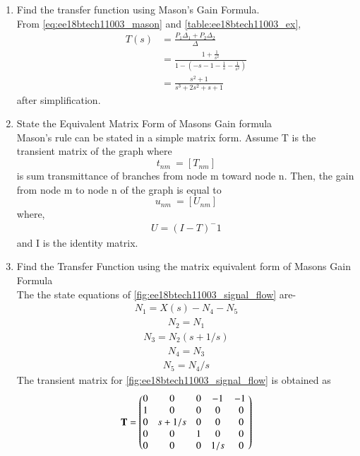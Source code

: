 \begin{enumerate}[label=\thesection.\arabic*.,ref=\thesection.\theenumi]
\item  Find the transfer function using Mason's Gain Formula.
\renewcommand{\thefigure}{\theenumi.\arabic{figure}}
%
\\
\solution From \eqref{eq:ee18btech11003_mason} and \ref{table:ee18btech11003_ex},
\begin{align}
T(s)&=\frac{P_1 \Delta_1+P_2 \Delta_2}{\Delta}
\\
&=\frac{1 +\frac{1}{s^2}}{1-(-s-1-\frac{1}{s}-\frac{1}{s^2})}
\\
&=\frac{s^2+1}{s^3+2s^2+s+1}
\end{align}
%
after simplification.
\renewcommand{\thefigure}{\theenumi}
\item State the Equivalent Matrix Form of  Masons Gain formula 
\\
\solution Mason's rule can be stated in a simple matrix form. Assume T is  the transient matrix of the graph where \[t_{nm}\ =[T_{nm}]\] is sum transmittance of branches from node m toward node n. Then, the gain from node m to node n of the graph is equal to \[u_{nm}\ =[U_{nm}]\] where,
\begin{align}
    U=(I-T)^-1
\end{align}
and I is the identity matrix.
\item Find the Transfer Function using the matrix equivalent form of Masons Gain Formula
\\
\solution 
The the state equations of \ref{fig:ee18btech11003_signal_flow} are-
\begin{align}
N_1=X(s)-N_4-N_5
\end{align}
\begin{align}
N_2=N_1
\end{align}
\begin{align}
N_3=N_2(s+1/s)
\end{align}
\begin{align}
N_4=N_3
\end{align}
\begin{align}
N_5=N_4/s
\end{align}
The transient matrix for \ref{fig:ee18btech11003_signal_flow}  is obtained as
\begin{align}
\mathbf{T} = \begin{pmatrix}0 & 0 & 0 & -1 & -1 \ \\
1 & 0 & 0 & 0 & 0   \\
 0 & s+1/s & 0 & 0 & 0 \\
 0 & 0 & 1 & 0 & 0 \\
0 & 0 & 0 & 1/s & 0 \end{pmatrix}
\end{align}
\begin{align}

\end{align}
\end{enumerate}
